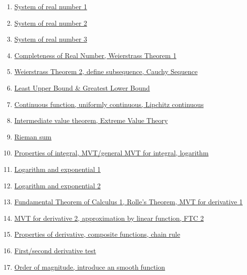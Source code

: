 \documentclass[11pt]{article}
\begin{document}
\begin{enumerate}
	\item \href{https://mp.weixin.qq.com/s/aRWrlvisSPUyQY6G8bt8XA}{System of real number 1}	%
	\item \href{https://mp.weixin.qq.com/s/henNU4zPR_yXjaqzXPTk6w}{System of real number 2}	%
	\item \href{https://mp.weixin.qq.com/s/ZMfZ3gmRMELibbHYZT31Bw}{System of real number 3}	%
	\item \href{https://mp.weixin.qq.com/s/dAzIXujM2Ztv5dhAic4pjg}{Completeness of Real Number, Weierstrass Theorem 1}	%
	\item \href{https://mp.weixin.qq.com/s/cJoPRLFBSuXa1SGsen0duQ}{Weierstrass Theorem 2, define subsequence, Cauchy Sequence}	%
	\item \href{https://mp.weixin.qq.com/s/f35OfWIHRAcmMfie0F7lFg}{Least Upper Bound \& Greatest Lower Bound}	%
	\item \href{https://mp.weixin.qq.com/s/9rx4aAQrB1vRyIwAIg1KXQ}{Continuous function, uniformly continuous, Lipchitz continuous}	%
	\item \href{https://mp.weixin.qq.com/s/ATm88605is00bQxQLUZ-PA}{Intermediate value theorem, Extreme Value Theory}	%
	\item \href{https://mp.weixin.qq.com/s/ytuoZYjY2xCNi9Dsa65Y5g}{Rieman sum}	%
	\item \href{https://mp.weixin.qq.com/s/uWfljPPgj0LGRM7iyk1mNg}{Properties of integral, MVT/general MVT for integral, logarithm}	%
	\item \href{https://mp.weixin.qq.com/s/KsTIZjU5m_lbgQkrcE0zdA}{Logarithm and exponential 1}	%
	\item \href{https://mp.weixin.qq.com/s/AX-xsj2DspX2CO_8VvFOPA}{Logarithm and exponential 2}	%
	\item \href{https://mp.weixin.qq.com/s/ZFbnBA_79XyjBBL21OuW5A}{Fundamental Theorem of Calculus 1, Rolle's Theorem, MVT for derivative 1}	%
	\item \href{https://mp.weixin.qq.com/s/aTRJWwRRFsJHvkcteVyruw}{MVT for derivative 2, approximation by linear function, FTC 2}	%
	\item \href{https://mp.weixin.qq.com/s/wKSPlTi0H9EP1Y2RPweSVQ}{Properties of derivative, composite functions, chain rule}	%
	\item \href{https://mp.weixin.qq.com/s/pGkX3-pMSFTGLiDeGMyTAw}{First/second derivative test}	%
	\item \href{https://mp.weixin.qq.com/s/cxEM3aY-GiW_MsM3eeY-TA}{Order of magnitude, introduce an smooth function}	%

\end{enumerate}
\end{document}
